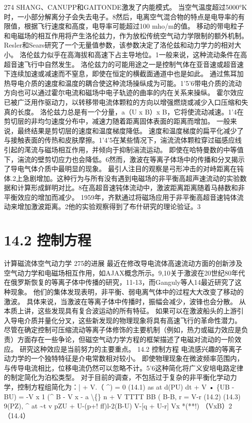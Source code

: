 \documentclass[UTF8,11pt,a4paper,openany,fontset=fandol]{ctexbook}
\begin{document}
274 SHANG、CANUPP和GAITONDE激发了内能模式。 当空气温度超过5000°K时，一小部分解离分子会失去电子。8然后，电离空气混合物的特点是电导率的有限值，根据飞行速度和高度，电导率可能超过100 mho/m的值。 移动的带电粒子和电磁场的相互作用将产生洛伦兹力，作为放松传统空气动力学限制的额外机制。 Resler和Sears研究了一个无量值参数，该参数决定了洛伦兹和动力学力的相对大小。 洛伦兹力似乎在高海拔和高速下占主导地位。1一般来说，这种流动条件在高超音速飞行中自然发生。 洛伦兹力的可能用途之一是控制气体在亚音速或超音速下连续加速或减速而不窒息，即使在恒定的横截面通道中也是如此。 通过焦耳加热导电介质的速度和温度的耦合使这种流场操纵成为可能。1'5'6带电介质的流动方向也可以通过霍尔电流和磁场中电子轨迹的曲率的内在关系来操纵。 霍尔效应已被广泛用作驱动力，以转移带电流体颗粒的方向以增强燃烧或减少入口压缩和失真的长度。 洛伦兹力总是有一个分量，a（U x B）x B，它将使流动减速。1'4在剪切层的非均匀速度分布中，减速力随着距离固体表面的距离而增加。 一般来说，最终结果是剪切层的速度和温度梯度降低。 速度和温度梯度的扁平化减少了与接触表面的传热和皮肤摩擦。1'4'5在某些情况下，湍流流体颗粒穿过磁感应线引起的滗流与磁场相互作用，并倾向于抑制湍流运动。 即使在哈特曼数的中等值下，湍流的壁剪切应力也会降低。6然而，激波在等离子体场中的传播和分叉揭示了导电气体介质中最明显的现象。 最引人注目的观察是弓形冲击的对峙距离在钝体.2上急剧增加。这种行为与所有没有遇到电磁场的非平衡高超声速流动的实验数据和计算形成鲜明对比。8在高超音速钝体流动中，激波距离距离随着马赫数和非平衡效应的增加而减少。 1959年，齐默通过将磁场应用于非平衡高超音速钝体流动来增加激波距离。2他的实验观察得到了布什研究的理论验证。3

\section{14.2 控制方程}
计算磁流体空气动力学 275的进展 最近在修改导电流体高速流动方面的创新涉及空气动力学和电磁场相互作用，如AJAX概念所示。9,10关于激波在20世纪80年代在俄罗斯恢复的等离子体中传播的研究，11-13，而Ganguly等人14最近研究了这种现象。 他们的集体发现表明，非平衡、弱电离气体中的过程大大改变了移动的激波。 具体来说，当激波在等离子体中传播时，振幅会减少，波锋也会分散。 从本质上讲，这些发现具有复合波运动的所有特征。 如果可以在激波船头的上游引入导电介质并量化分叉，这些新发现的物理现象将具有高速飞行的革命性潜力。 尽管在确定控制可压缩流动等离子体修饰的主要机制（例如，热力或磁力效应是负责）方面存在一些争论，但磁空气动力学方程的框架描述了电磁对流动的一阶效应。 研究这种效应是当前努力的主要重点。 14.2 控制方程 电流感兴趣的等离子动力学的一个独特特征是介电常数相对较小。 即使物理现象在微波频率范围内，与传导电流相比，位移电流仍然可以忽略不计。5'6这种简化将广义安培电路定律的制定简化为泊松类型。 对于目前的调查，不包括过于复杂的非平衡化学动力学，控制方程组简化为：| + V.（ \textasciicircum{}) = 0 (14.1) as at d(PU) dt + V • \{UB - BU) = -V x 1 (\textasciicircum{} B - V x - a \textbackslash\{\} n + V TTTT BB ( B-B, r = V-r (14.2) (14.3) 9(PZ), \textasciicircum{} at \textasciitilde{}t v pZU + U-(p+! ff)l-2(B-U) V-[q + U-r] Vx *(**!) （VxB）2（14.4）
\end{document}
